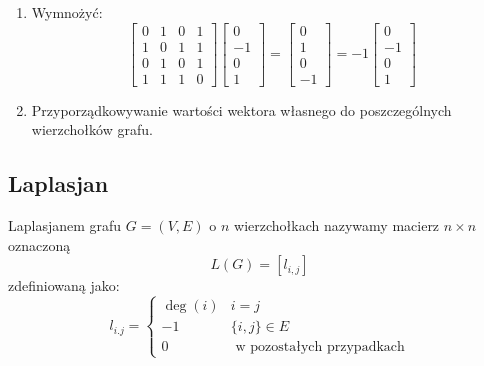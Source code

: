\begin{enumerate}[label=\Roman*.]
\item Wymnożyć:
$$\begin{bmatrix}
0&1&0&1\\
1&0&1&1\\
0&1&0&1\\
1&1&1&0
\end{bmatrix}\begin{bmatrix}
0\\-1\\0\\1
\end{bmatrix}=\begin{bmatrix}
0\\1\\0\\-1
\end{bmatrix}=-1\begin{bmatrix}
0\\-1\\0\\1
\end{bmatrix}$$

\item Przyporządkowywanie wartości wektora własnego do poszczególnych wierzchołków grafu. 
\end{enumerate}

\subsection{Laplasjan}
\begin{definition}[Laplasjan]
Laplasjanem grafu $G=(V,E)$ o $n$ wierzchołkach nazywamy macierz $n\times n$ oznaczoną $$L(G)=[l_{i,j}]$$ zdefiniowaną jako: $$l_{i.j}=\left\{\begin{matrix}
\deg (i) & i=j\\
-1 & \{i,j\}\in E\\
0 & \text{ w pozostałych przypadkach}
\end{matrix}\right.$$
\end{definition}

